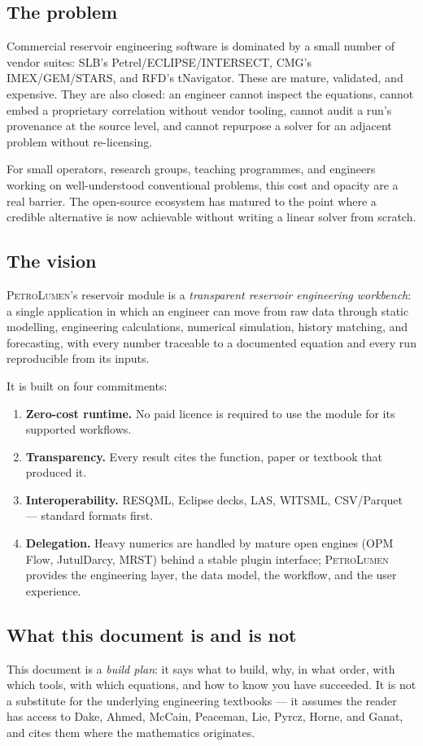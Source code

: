 \documentclass[11pt,a4paper]{article}
\newcommand{\petro}{\textsc{PetroLumen}}
\begin{document}
\subsection{The problem}
Commercial reservoir engineering software is dominated by a small number of
vendor suites: SLB's Petrel/ECLIPSE/INTERSECT, CMG's IMEX/GEM/STARS, and
RFD's tNavigator. These are mature, validated, and expensive. They are also
closed: an engineer cannot inspect the equations, cannot embed a proprietary
correlation without vendor tooling, cannot audit a run's provenance at the
source level, and cannot repurpose a solver for an adjacent problem without
re-licensing.

For small operators, research groups, teaching programmes, and engineers
working on well-understood conventional problems, this cost and opacity are a
real barrier. The open-source ecosystem has matured to the point where a
credible alternative is now achievable without writing a linear solver from
scratch.

\subsection{The vision}
\petro's reservoir module is a \emph{transparent reservoir engineering
workbench}: a single application in which an engineer can move from raw data
through static modelling, engineering calculations, numerical simulation,
history matching, and forecasting, with every number traceable to a documented
equation and every run reproducible from its inputs.

It is built on four commitments:
\begin{enumerate}[leftmargin=1.6em]
  \item \textbf{Zero-cost runtime.} No paid licence is required to use the
        module for its supported workflows.
  \item \textbf{Transparency.} Every result cites the function, paper or
        textbook that produced it.
  \item \textbf{Interoperability.} RESQML, Eclipse decks, LAS, WITSML,
        CSV/Parquet --- standard formats first.
  \item \textbf{Delegation.} Heavy numerics are handled by mature open engines
        (OPM Flow, JutulDarcy, MRST) behind a stable plugin interface; \petro
        provides the engineering layer, the data model, the workflow, and the
        user experience.
\end{enumerate}

\subsection{What this document is and is not}
This document is a \emph{build plan}: it says what to build, why, in what order,
with which tools, with which equations, and how to know you have succeeded. It
is not a substitute for the underlying engineering textbooks --- it assumes the
reader has access to Dake, Ahmed, McCain, Peaceman, Lie, Pyrcz, Horne, and
Ganat, and cites them where the mathematics originates.
\end{document}
